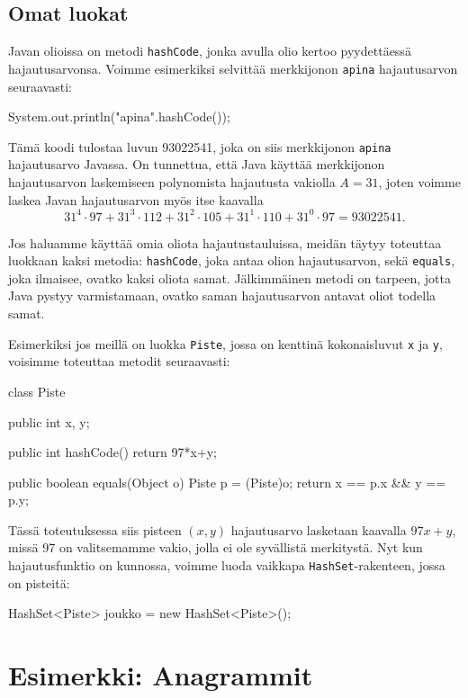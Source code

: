 \subsection{Omat luokat}

Javan olioissa on metodi \texttt{hashCode},
jonka avulla olio kertoo pyydettäessä hajautusarvonsa.
Voimme esimerkiksi selvittää merkkijonon \texttt{apina}
hajautusarvon seuraavasti:

\begin{code}
System.out.println("apina".hashCode());
\end{code}

Tämä koodi tulostaa luvun 93022541,
joka on siis merkkijonon \texttt{apina} hajautusarvo Javassa.
On tunnettua, että Java käyttää merkkijonon hajautusarvon laskemiseen
polynomista hajautusta vakiolla $A=31$,
joten voimme laskea Javan hajautusarvon myös itse kaavalla
\[31^4 \cdot 97+31^3 \cdot 112+31^2 \cdot 105+31^1 \cdot 110+31^0 \cdot 97=93022541.\]

Jos haluamme käyttää omia oliota hajautustauluissa,
meidän täytyy toteuttaa luokkaan kaksi metodia:
\texttt{hashCode}, joka antaa olion hajautusarvon,
sekä \texttt{equals},
joka ilmaisee, ovatko kaksi oliota samat.
Jälkimmäinen metodi on tarpeen,
jotta Java pystyy varmistamaan, ovatko saman hajautusarvon
antavat oliot todella samat.


Esimerkiksi jos meillä on luokka \texttt{Piste},
jossa on kenttinä kokonaisluvut \texttt{x} ja \texttt{y},
voisimme toteuttaa metodit seuraavasti:

\begin{code}
class Piste {
    public int x, y;

    public int hashCode() {
        return 97*x+y;
    }
    
    public boolean equals(Object o) {
        Piste p = (Piste)o;
        return x == p.x && y == p.y;
    }
}
\end{code}

Tässä toteutuksessa siis pisteen $(x,y)$ hajautusarvo lasketaan
kaavalla $97x+y$, missä 97 on valitsemamme vakio, jolla ei ole
syvällistä merkitystä.
Nyt kun hajautusfunktio on kunnossa,
voimme luoda vaikkapa \texttt{HashSet}-rakenteen, jossa on pisteitä:

\begin{code}
HashSet<Piste> joukko = new HashSet<Piste>();
\end{code}

\section{Esimerkki: Anagrammit}

